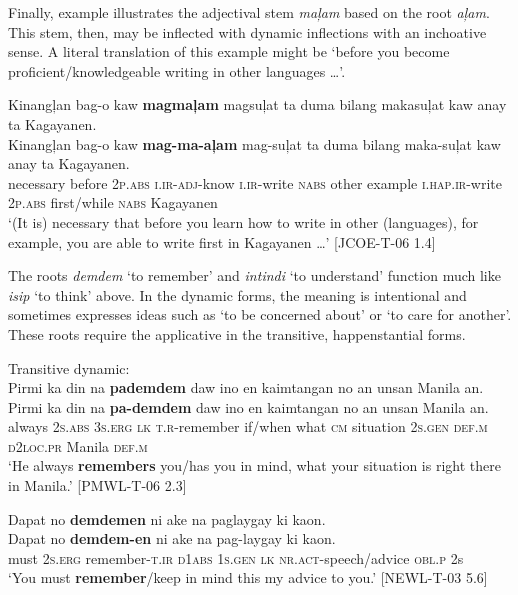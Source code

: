 Finally, example  illustrates the adjectival stem \textit{maļam} based on the root \textit{aļam}. This stem, then, may be inflected with dynamic inflections with an inchoative sense. A literal translation of this example might be ‘before you become proficient/knowledgeable writing in other languages  …’.

\ea
\label{ex:writeinkagayanen}
Kinangļan  bag-o  kaw  \textbf{magmaļam}   magsuļat  ta  duma bilang makasuļat  kaw  anay  ta  Kagayanen.\\\smallskip
\gll Kinangļan  bag-o  kaw  \textbf{mag-ma-aļam}   mag-suļat  ta  duma bilang maka-suļat  kaw  anay  ta  Kagayanen.\\
necessary  before  2\textsc{p.abs}  \textsc{i.ir}-\textsc{adj}-know  \textsc{i.ir}-write  \textsc{nabs}  other
example \textsc{i.hap.ir}-write  2\textsc{p.abs}  first/while  \textsc{nabs}  Kagayanen \\
\glt `(It is) necessary that before you learn how to write in other (languages), for example, you are able to write first in Kagayanen  …’ [JCOE-T-06 1.4]
\z

The roots \textit{demdem} ‘to remember’ and \textit{intindi} ‘to understand’ function much like \textit{isip} ‘to think’ above. In the dynamic forms, the  meaning is intentional and sometimes expresses ideas such as ‘to be concerned about’ or ‘to care for another’. These roots require the applicative in the transitive, happenstantial forms.

\ea
Transitive dynamic: \\
Pirmi  ka  din  na  \textbf{pademdem}  daw  ino  en  kaimtangan no  an  unsan  Manila  an. \\\smallskip
\gll Pirmi  ka  din  na  \textbf{pa-demdem}  daw  ino  en  kaimtangan no  an  unsan  Manila  an. \\
always  2\textsc{s.abs}  3\textsc{s.erg}  \textsc{lk}  \textsc{t.r}-remember  if/when  what  \textsc{cm}   situation
2\textsc{s.gen}  \textsc{def.m}  \textsc{d2loc.pr}  Manila  \textsc{def.m} \\
\glt `He always \textbf{remembers} you/has you in mind, what your situation is right there in Manila.’ [PMWL-T-06 2.3]
\z

\ea
Dapat  no  \textbf{demdemen}  ni  ake  na  paglaygay ki  kaon. \\\smallskip
\gll Dapat  no  \textbf{demdem-en}  ni  ake  na  pag-laygay ki  kaon. \\
must  2\textsc{s.erg}  remember-\textsc{t.ir}  \textsc{d1abs}  1\textsc{s.gen}  \textsc{lk}  \textsc{nr.act}-speech/advice
\textsc{obl.p}  2s \\
\glt `You must \textbf{remember}/keep in mind this my advice to you.’ [NEWL-T-03 5.6]
\z

